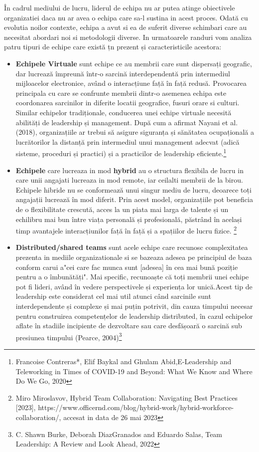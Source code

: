 \documentclass[a4paper, 12pt]{article}
\begin{document}
	\quad\quad În cadrul mediului de lucru, liderul de echipa nu ar putea atinge obiectivele organizatiei daca nu ar avea o echipa care sa-l sustina in acest proces. Odată cu evolutia noilor contexte, echipa a avut si ea de suferit diverse schimbari care au necesitat abordari noi si metodologii diverse. In urmatoarele randuri vom analiza patru tipuri de echipe care există țn prezent și caracteristicile acestora:


	\begin{itemize}

	\item \textbf{Echipele Virtuale} sunt echipe ce au membrii care sunt dispersați geografic, dar lucrează împreună într-o sarcină interdependentă prin intermediul mijloacelor electronice, având o interacțiune față în față redusă. Provocarea principala cu care se confrunte membrii dintr-o asemenea echipa este coordonarea sarcinilor in diferite locatii geografice, fusuri orare si culturi. Similar echipelor tradiționale, conducerea unei echipe virtuale necesită abilități de leadership și management. După cum a afirmat Nayani et al. (2018), organizațiile ar trebui să asigure siguranța și sănătatea ocupațională a lucrătorilor la distanță prin intermediul unui management adecvat (adică sisteme, proceduri și practici) și a practicilor de leadership eficiente.\footnote{Francoise Contreras*, Elif Baykal and Ghulam Abid,E-Leadership and Teleworking in Times of COVID-19 and Beyond: What We Know and Where Do We Go, 2020}

	\item \textbf{Echipele} care lucreaza in mod \textbf{hybrid} au o structura flexibila de lucru in care unii angajati lucreaza in mod remote, iar ceilalti membrii de la birou. Echipele hibride nu se conformează unui singur mediu de lucru, deoarece toți angajații lucrează în mod diferit. Prin acest model, organizațiile pot beneficia de o flexibilitate crescută, acces la un piata mai larga de talente și un echilibru mai bun între viața personală și profesională, păstrând în același timp avantajele interacțiunilor față în față și a spațiilor de lucru fizice. \footnote{Miro Miroslavov, Hybrid Team Collaboration: Navigating Best Practices [2023], https://www.officernd.com/blog/hybrid-work/hybrid-workforce-collaboration/,  accesat in data de 26 mai 2023}

	\item \textbf {Distributed/shared teams} sunt acele echipe care recunosc complexitatea prezenta in mediile organizationale si se bazeaza adesea pe principiul de baza conform carui a"cei care fac munca sunt [adesea] în cea mai bună poziție pentru a o îmbunătăți". Mai specific, recunoaște că toți membrii unei echipe pot fi lideri, având în vedere perspectivele și experiența lor unică.Acest tip de leadership este considerat cel mai util atunci când sarcinile sunt interdependente și complexe și mai puțin potrivit, din cauza timpului necesar pentru construirea competențelor de leadership distributed, în cazul echipelor aflate în stadiile incipiente de dezvoltare sau care desfășoară o sarcină sub presiunea timpului (Pearce, 2004)\footnote{C. Shawn Burke, Deborah DiazGranados and Eduardo Salas, Team Leadership: A Review and Look Ahead, 2022}



\end{itemize}
\end{document}
